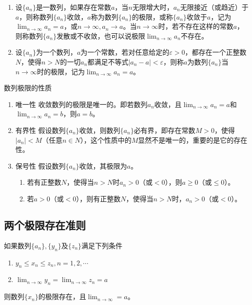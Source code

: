 \begin{definition}[数列的极限] \label{def:sequence_limit}
\begin{enumerate}
    \item 设$\{a_n\}$是一数列，如果存在常数$a$，当$n$无限增大时，$a_n$无限接近（或趋近）于$a$，则称数列$\{a_n\}$收敛，$a$称为数列$\{a_n\}$的极限，或称$\{a_n\}$收敛于$a$，记为$\displaystyle \lim_{n\rightarrow \infty} a_n = a$，或$n\rightarrow \infty,a_n\rightarrow a$。当$n\rightarrow \infty$时，若不存在这样的常数$a$，则称数列$\{a_n\}$发散或不收敛，也可以说极限$\displaystyle \lim_{n\rightarrow \infty} a_n$不存在。

    \item 设$\{a_n\}$为一个数列，$a$为一个常数，若对任意给定的$\varepsilon > 0$，都存在一个正整数$N$，使得$n>N$的一切$a_n$都满足不等式$\left|a_n-a\right|<\varepsilon$，则称$a$为数列$\{a_n\}$当$n\rightarrow \infty$时的极限，记为$\displaystyle \lim_{n\rightarrow \infty} a_n = a$。
\end{enumerate}
\end{definition}

\begin{property} 数列极限的性质 \label{property:sequence_limit}
\begin{enumerate}
    \item 唯一性 \quad 收敛数列的极限是唯一的。即若数列${a_n}$收敛，且$\displaystyle \lim_{n\rightarrow \infty} a_n = a$和$\displaystyle \lim_{n\rightarrow \infty} a_n = b$，则$a=b$。

    \item 有界性 \quad 假设数列$\{a_n\}$收敛，则数列$\{a_n\}$必有界，即存在常数$M>0$，使得$\left|a_n\right|<M$（任意$n\in N$），这个性质中的$M$显然不是唯一的，重要的是它的存在性。

    \item 保号性 \quad 假设数列$\{a_n\}$收敛，其极限为$a$。
    \begin{enumerate}
        \item \quad 若有正整数$N$，使得当$n>N$时$a_n>0$（或$<0$），则$a\geq 0$（或$\leq 0$）。
        \item \quad 若$a>0$（或$<0$），则有正整数$N$，使得当$n>N$时，$a_n>0$（或$<0$）。
    \end{enumerate}
\end{enumerate}
\end{property}

\subsection{两个极限存在准则}
\begin{theorem}[夹逼定理] \label{thm:squeeze_theorem_sequence}
    如果数列$\{a_n\},\{y_n\}$及$\{z_n\}$满足下列条件
    \begin{enumerate}
        \item $y_n\leq x_n \leq z_n, n=1,2,\cdots$
        \item $\displaystyle\lim_{n\rightarrow\infty} y_n = \lim_{n\rightarrow\infty} z_n = a$
    \end{enumerate}
    则数列$\{x_n\}$的极限存在，且$\displaystyle\lim_{n\rightarrow \infty} = a$。
\end{theorem}


